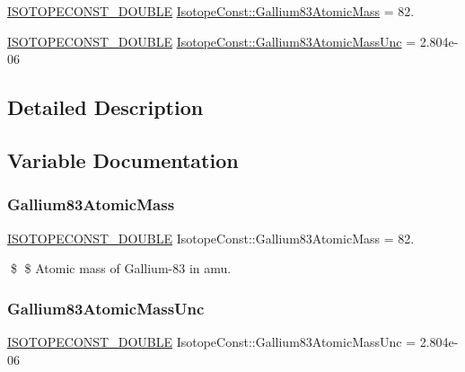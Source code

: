 \begin{DoxyCompactItemize}
\item 
\mbox{\hyperlink{group___isotope_const-_macros_ga8f45a7272ce02c0b4c65c44636ed719a}{I\+S\+O\+T\+O\+P\+E\+C\+O\+N\+S\+T\+\_\+\+D\+O\+U\+B\+LE}} \mbox{\hyperlink{group___isotope_const-_gallium-_ga83_ga09e6aa5c7b9be3711eb145a01525ccd7}{Isotope\+Const\+::\+Gallium83\+Atomic\+Mass}} = 82.
\item 
\mbox{\hyperlink{group___isotope_const-_macros_ga8f45a7272ce02c0b4c65c44636ed719a}{I\+S\+O\+T\+O\+P\+E\+C\+O\+N\+S\+T\+\_\+\+D\+O\+U\+B\+LE}} \mbox{\hyperlink{group___isotope_const-_gallium-_ga83_ga96fbf5f3de9bb7e0cfa4f914e50a392c}{Isotope\+Const\+::\+Gallium83\+Atomic\+Mass\+Unc}} = 2.\+804e-\/06
\end{DoxyCompactItemize}


\subsection{Detailed Description}


\subsection{Variable Documentation}
\mbox{\label{group___isotope_const-_gallium-_ga83_ga09e6aa5c7b9be3711eb145a01525ccd7}} 
\subsubsection{\texorpdfstring{Gallium83\+Atomic\+Mass}{Gallium83AtomicMass}}
{\footnotesize\ttfamily \mbox{\hyperlink{group___isotope_const-_macros_ga8f45a7272ce02c0b4c65c44636ed719a}{I\+S\+O\+T\+O\+P\+E\+C\+O\+N\+S\+T\+\_\+\+D\+O\+U\+B\+LE}} Isotope\+Const\+::\+Gallium83\+Atomic\+Mass = 82.}

\$ \$ Atomic mass of Gallium-\/83 in amu. \mbox{\label{group___isotope_const-_gallium-_ga83_ga96fbf5f3de9bb7e0cfa4f914e50a392c}} 
\subsubsection{\texorpdfstring{Gallium83\+Atomic\+Mass\+Unc}{Gallium83AtomicMassUnc}}
{\footnotesize\ttfamily \mbox{\hyperlink{group___isotope_const-_macros_ga8f45a7272ce02c0b4c65c44636ed719a}{I\+S\+O\+T\+O\+P\+E\+C\+O\+N\+S\+T\+\_\+\+D\+O\+U\+B\+LE}} Isotope\+Const\+::\+Gallium83\+Atomic\+Mass\+Unc = 2.\+804e-\/06}

